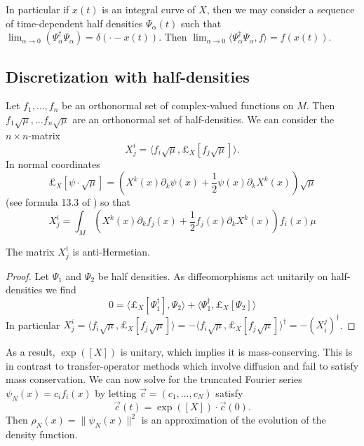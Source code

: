 In particular if $x(t)$ is an integral curve of $X$, then we may consider a sequence of time-dependent half densities $\Psi_\alpha(t)$ such that $\lim_{\alpha \to 0}( \Psi_\alpha^\dagger \Psi_\alpha) = \delta( \cdot - x(t) )$.
Then $\lim_{\alpha \to 0 } \langle \Psi_\alpha^\dagger \Psi_\alpha , f \rangle = f(x (t) )$.

\subsection{Discretization with half-densities}
Let $f_1, \dots, f_n$ be an orthonormal set of complex-valued functions on $M$.  Then $f_1 \sqrt{\mu} , \dots f_n \sqrt{\mu}$ are an orthonormal set of half-densities.  We can consider the $n \times n$-matrix
\[
	X_{j}^{i} = \langle f_i \sqrt{\mu} , \pounds_X [f_j \sqrt{\mu}]  \rangle.
\]
In normal coordinates
\[
	\pounds_X[ \psi \cdot \sqrt{\mu} ] = ( X^k(x) \partial_k \psi(x) + \frac{1}{2} \psi(x) \partial_k X^k(x) ) \sqrt{\mu}
\]
(see formula 13.3 of \cite{Meyer1993}) so that
\[
	X_j^i = \int_{M} ( X^k(x) \partial_k f_j(x) + \frac{1}{2} f_j(x) \partial_k X^k(x) ) f_i(x) \mu
\]
\begin{proposition}
	The matrix $X^i_j$ is anti-Hermetian.
\end{proposition}
\begin{proof}
	Let $\Psi_1$ and $\Psi_2$ be half densities.  As diffeomorphisms act unitarily on half-densities we find
	\[
		0 = \langle \pounds_X [\Psi_1^\dagger] , \Psi_2 \rangle + \langle \Psi_1^\dagger, \pounds_X[\Psi_2] \rangle
	\]
	In particular $X^i_j = \langle f_i \sqrt{\mu} , \pounds_X [f_j \sqrt{\mu}]  \rangle =  - \langle f_i \sqrt{\mu} , \pounds_X [f_j \sqrt{\mu}]  \rangle^\dagger = -(X^j_i)^\dagger$.
\end{proof}
As a result, $\exp([X])$ is unitary, which implies it is mass-conserving.  This is in contrast to transfer-operator methods which involve diffusion and fail to satisfy mass conservation.
We can now solve for the truncated Fourier series $\psi_N(x) = c_i f_i(x)$ by  letting $\vec{c} = (c_1, \dots, c_N)$ satisfy
\[
	\vec{c}(t) = \exp( [X] ) \cdot \vec{c}(0).
\]
Then $\rho_N(x) = \|\psi_N(x) \|^2$ is an approximation of the evolution of the density function.


